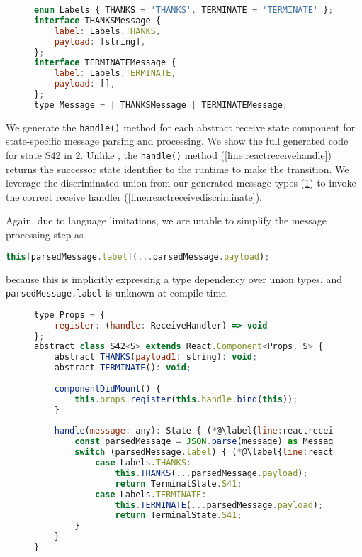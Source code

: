 \begin{figure}[!h]
\begin{lstlisting}[language=javascript,tabsize=2]
enum Labels { THANKS = 'THANKS', TERMINATE = 'TERMINATE' };
interface THANKSMessage {
    label: Labels.THANKS,
    payload: [string],
};
interface TERMINATEMessage {
    label: Labels.TERMINATE,
    payload: [],
};
type Message = | THANKSMessage | TERMINATEMessage;
\end{lstlisting}
\label{lst:reactreceivetypes}
\end{figure}
	
We generate the \texttt{handle()} method for each
abstract receive state component for state-specific message
parsing and processing. We show the full generated code
for state S42 in \cref{lst:reactreceivestate}.
Unlike ,
the \texttt{handle()} method (\cref{line:reactreceivehandle})
returns the successor state identifier to the runtime
to make the transition.
We leverage the discriminated union from our
generated message types (\cref{lst:reactreceivetypes})
to invoke the correct receive handler (\cref{line:reactreceivediscriminate}).

Again, due to language limitations, we are unable to 
simplify the message processing step as

\begin{lstlisting}[language=javascript,numbers=none]
this[parsedMessage.label](...parsedMessage.payload);
\end{lstlisting}

because this is implicitly expressing a type dependency
over union types,
and \texttt{parsedMessage.label} is unknown at compile-time.

\begin{figure}[!h]
\begin{lstlisting}[language=javascript,tabsize=2]
type Props = {
	register: (handle: ReceiveHandler) => void
};
abstract class S42<S> extends React.Component<Props, S> {
	abstract THANKS(payload1: string): void;
	abstract TERMINATE(): void;
	
	componentDidMount() {
		this.props.register(this.handle.bind(this));
	}
	
	handle(message: any): State { (*@\label{line:reactreceivehandle}@*)
		const parsedMessage = JSON.parse(message) as Message;
		switch (parsedMessage.label) { (*@\label{line:reactreceivediscriminate}@*)
			case Labels.THANKS:
				this.THANKS(...parsedMessage.payload);
				return TerminalState.S41;
			case Labels.TERMINATE:
				this.TERMINATE(...parsedMessage.payload);
				return TerminalState.S41;
		}
	}
}
\end{lstlisting}
\label{lst:reactreceivestate}
\end{figure}

